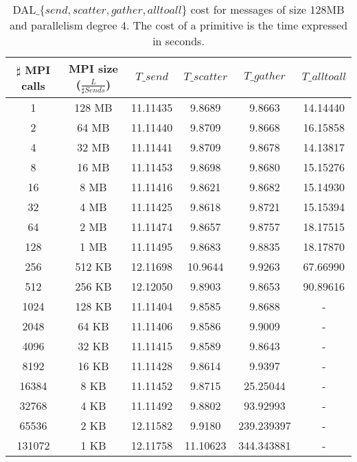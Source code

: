 \begin{table}[h]
\begin{center}
\begin{tabular}{|c|c|c|c|c|c|}\hline
\hline
$\sharp$ MPI calls & MPI size ($\frac{L}{\sharp Sends}$)  & $T\_send$   & $T\_scatter$  & $T\_gather$ & $T\_alltoall$      \\\hline\hline
1 & 128 MB & 11.11435 & 9.8689 & 9.8663 & 14.14440 \\\hline
2 & 64 MB & 11.11440 & 9.8709 & 9.8668 & 16.15858 \\\hline
4 & 32 MB & 11.11441 & 9.8709 & 9.8678 & 14.13817 \\\hline
8 & 16 MB & 11.11453 & 9.8698 & 9.8680 & 15.15276 \\\hline
16 & 8 MB & 11.11416 & 9.8621 & 9.8682 & 15.14930 \\\hline
32 & 4 MB & 11.11425 & 9.8618 & 9.8721 & 15.15394 \\\hline
64 & 2 MB & 11.11474 & 9.8657 & 9.8757 & 18.17515 \\\hline
128 & 1 MB & 11.11495 & 9.8683 & 9.8835 & 18.17870 \\\hline
256 & 512 KB & 12.11698 & 10.9644 & 9.9263 & 67.66990 \\\hline
512 & 256 KB & 12.12050 & 9.8903 & 9.8653 & 90.89616 \\\hline
1024 & 128 KB & 11.11404 & 9.8585 & 9.8688 & - \\\hline
2048 & 64 KB & 11.11406 & 9.8586 & 9.9009 & - \\\hline
4096 & 32 KB & 11.11415 & 9.8589 & 9.8643 & - \\\hline
8192 & 16 KB & 11.11428 & 9.8614 & 9.9397 & - \\\hline
16384 & 8 KB & 11.11452 & 9.8715 & 25.25044 & - \\\hline
32768 & 4 KB & 11.11492 & 9.8802 & 93.92993 & - \\\hline
65536 & 2 KB & 12.11582 & 9.9180 & 239.239397 & - \\\hline
131072 & 1 KB & 12.11758 & 11.10623 & 344.343881 & - \\\hline
\end{tabular}
\caption{DAL$\_\lbrace send, scatter, gather, alltoall \rbrace$ cost for messages of size 128MB and parallelism degree 4. The cost of a primitive is the time expressed in seconds. }
\label{tsetup-pianosa-n4-M128}
\end{center}
\end{table}


